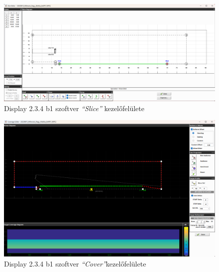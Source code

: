 \begin{figure}[H]
    \centering
    \includegraphics[width=\textwidth, keepaspectratio]{figures/display_wpc_1.png}
    \caption{Display 2.3.4 b1 szoftver \textit{``Slice''} kezelőfelülete}\label{fig:display_wpc_1}
\end{figure}

\begin{figure}[H]
    \centering
    \includegraphics[width=\textwidth, keepaspectratio]{figures/display_wpc_2.png}
    \caption{Display 2.3.4 b1 szoftver \textit{``Cover''}kezelőfelülete}\label{fig:display_wpc_2}
\end{figure}

